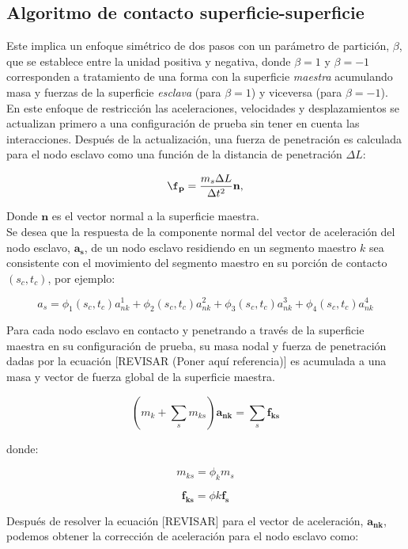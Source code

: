 \subsection{Algoritmo de contacto superficie-superficie}

Este implica un enfoque simétrico de dos pasos con un parámetro 
de partición, $\beta$, que se establece entre la unidad positiva y negativa, donde $\beta=1$ 
y $\beta=-1$ corresponden a tratamiento de una forma con la superficie \textit{maestra} 
acumulando masa y fuerzas de la superficie \textit{esclava} (para $\beta = 1$) y viceversa 
(para $\beta = -1$). ~\cite{lsdyna-manual} \\ 

En este enfoque de restricción las aceleraciones, velocidades y desplazamientos se actualizan 
primero a una configuración de prueba sin tener en cuenta las interacciones. Después de la 
actualización, una fuerza de penetración es calculada para el nodo esclavo como una función 
de la distancia de penetración $\Delta L$:

$$
\mathbf{\f_p} = \frac{m_s \Delta L}{\Delta t^2}\mathbf{n},
$$

Donde $\mathbf{n}$ es el vector normal a la superficie maestra.\\

Se desea que la respuesta de la componente normal del vector de aceleración del nodo esclavo, 
$\mathbf{a_s}$, de un nodo esclavo residiendo en un segmento maestro $k$ sea consistente con 
el movimiento del segmento maestro en su porción de contacto $(s_c,t_c)$, por ejemplo:

$$
a_s = \phi_1 (s_c,t_c) a_{nk}^1 + \phi_2 (s_c,t_c) a_{nk}^2 + \phi_3 (s_c,t_c) a_{nk}^3 + \phi_4 (s_c,t_c) a_{nk}^4
$$

Para cada nodo esclavo en contacto y penetrando a través de la superficie maestra en 
su configuración de prueba, su masa nodal y fuerza de penetración dadas por la ecuación 
[REVISAR (Poner aquí referencia)] es acumulada a una masa y vector de fuerza global de 
la superficie maestra.

$$
\left(
m_k + \sum_s m_{ks}
\right)
\mathbf{a_{nk}}
=
\sum_s \mathbf{f_{ks}}
$$

donde:

$$
m_{ks} = \phi_k m_s
$$

$$
\mathbf{f_{ks}} = \phi{k} \mathbf{f_s}
$$

Después de resolver la ecuación [REVISAR] para el vector de aceleración, $\mathbf{a_{nk}}$, podemos 
obtener la corrección de aceleración para el nodo esclavo como:

